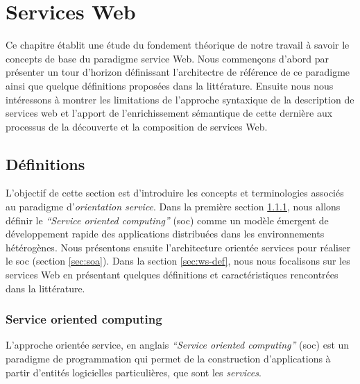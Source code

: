 \chapter{Services Web}
\label{ch:web-service}

Ce chapitre établit une étude du fondement théorique de notre travail
à savoir le  concepts de base du paradigme service Web.  Nous
commençons d'abord par présenter un tour d'horizon définissant
l'architectre de référence de ce paradigme ainsi que quelque
définitions proposées dans la littérature. Ensuite nous nous
intéressons à montrer les limitations de l'approche syntaxique de la
description de services web et l'apport de l'enrichissement sémantique
de cette dernière aux processus de la découverte et la composition de
services Web.


\newpage
\section{Définitions}
\label{sec:ws-definitions}
L'objectif de cette section est d'introduire les concepts et
terminologies associés au paradigme d'\textit{orientation
  service}. Dans la première section \ref{sec:soc}, nous allons
définir le \textit{``Service oriented computing''} (\acrshort{soc})
comme un modèle émergent de développement rapide des applications
distribuées dans les environnements hétérogènes. Nous présentons
ensuite l'architecture orientée services pour réaliser le
\acrshort{soc} (section \ref{sec:soa}). Dans la section
\ref{sec:ws-def}, nous nous focalisons sur les services Web en
présentant quelques définitions et caractéristiques rencontrées dans
la littérature.

  \subsection{Service oriented computing}
  \label{sec:soc}
  L'approche orientée service, en anglais \textit{``Service oriented
    computing''} (\acrshort{soc}) est un paradigme de programmation
  qui permet de la construction d'applications à partir d'entités
  logicielles particulières, que sont les \emph{services}.\bigskip

